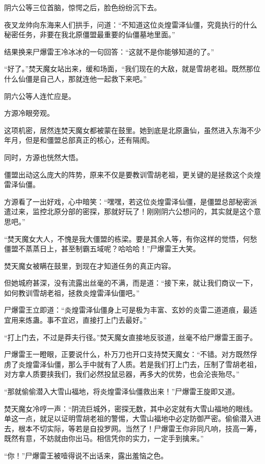 \begin{this_body}
阴六公等三位首脑，惊愕之后，脸色纷纷沉下去。

夜叉龙帅向东海来人们拱手，问道：“不知道这位炎煌雷泽仙僵，究竟执行的什么秘密任务，非要在我北原僵盟最重要的仙僵墓地里面。”

结果换来尸爆雷王冷冰冰的一句回答：“这就不是你能够知道的了。”

“好了。”焚天魔女站出来，缓和场面，“我们现在的大敌，就是雪胡老祖。既然那位什么仙僵是自己人，那就连他一起救下来吧。”

阴六公等人连忙应是。

方源冷眼旁观。

这项机密，居然连焚天魔女都被蒙在鼓里。她到底是北原蛊仙，虽然进入东海不少年月，但是和僵盟总部真正的核心，还有隔阂。

同时，方源也恍然大悟。

僵盟出动这么庞大的阵势，原来不仅是要教训雪胡老祖，更关键的是拯救这个炎煌雷泽仙僵。

方源看了一出好戏，心中暗笑：“嘿嘿，若这位炎煌雷泽仙僵，是僵盟总部秘密派遣过来，监控北原分部的密探，那就好玩了！刚刚阴六公想问的，其实就是这个意思吧。”

“焚天魔女大人，不愧是我大僵盟的栋梁。要是其余人等，有你这样的觉悟，何愁僵盟不蒸蒸日上，甚至制霸五域呢？哈哈哈！”尸爆雷王大笑。

焚天魔女被瞒在鼓里，到现在才知道任务的真正内容。

但她城府甚深，没有流露出丝毫的不满，而是道：“接下来，就让我们商议一下，如何教训雪胡老祖，拯救炎煌雷泽仙僵吧。”

尸爆雷王立即道：“炎煌雷泽仙僵身上可是极为丰富、玄妙的炎雷二道道痕，最适宜用来炼蛊。事不宜迟，直接打上门去最好。”

“打上门去，不过是莽夫行径。”焚天魔女直接地反驳道，丝毫不给尸爆雷王面子。

尸爆雷王一瞪眼，正要说什么，朴万刀也开口支持焚天魔女：“不错。对方既然俘虏了炎煌雷泽仙僵，那么手中就有了人质。若是我们打上门去，压制了雪胡老祖，对方拿人质要挟我们，我们必然投鼠忌器，再多大的优势，也会沦丧殆尽。”

“那就偷偷潜入大雪山福地，将炎煌雷泽仙僵救出来！”尸爆雷王旋即又道。

焚天魔女冷哼一声：“阴流巨城外，密探无数，其中必定就有大雪山福地的眼线。单这一点，就足以证明雪胡老祖的警惕，大雪山福地中必定防御严密。偷偷潜入进去，根本不切实际，等若是自投罗网。当然了！尸爆雷王你非同凡响，技高一筹，既然有意，不妨就由你出马。相信凭你的实力，一定手到擒来。”

“你！”尸爆雷王被噎得说不出话来，露出羞恼之色。


\end{this_body}
